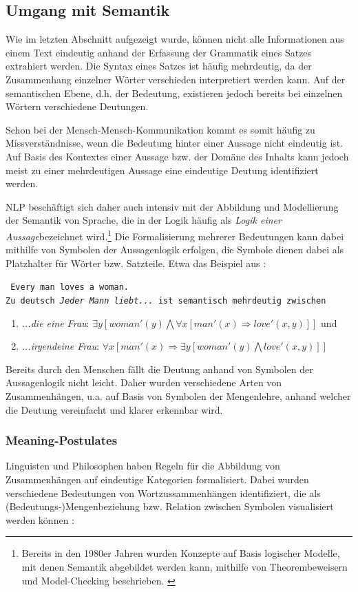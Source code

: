 \documentclass[12pt]{report}
\begin{document}
\subsection{Umgang mit Semantik}
Wie im letzten Abschnitt aufgezeigt wurde, können nicht alle Informationen aus einem Text eindeutig anhand der Erfassung der Grammatik eines Satzes extrahiert werden. Die Syntax eines Satzes ist häufig mehrdeutig, da der Zusammenhang einzelner Wörter verschieden interpretiert werden kann. Auf der semantischen Ebene, d.h. der Bedeutung, existieren jedoch bereits bei einzelnen Wörtern verschiedene Deutungen. 

Schon bei der Mensch-Mensch-Kommunikation kommt es somit häufig zu Missverständnisse, wenn die Bedeutung hinter einer Aussage nicht eindeutig ist. Auf Basis des Kontextes einer Aussage bzw. der Domäne des Inhalts kann jedoch meist zu einer mehrdeutigen Aussage eine eindeutige Deutung identifiziert werden.

NLP beschäftigt sich daher auch intensiv mit der Abbildung und Modellierung der Semantik von Sprache, die in der Logik häufig als \glqq \textit{Logik einer Aussage}\grqq bezeichnet wird.\footnote{Bereits in den 1980er Jahren wurden Konzepte auf Basis logischer Modelle, mit denen Semantik abgebildet werden kann, mithilfe von Theorembeweisern und Model-Checking beschrieben. \cite{sb88} \cite{kn85}} Die Formalisierung mehrerer Bedeutungen kann dabei mithilfe von Symbolen der Aussagenlogik erfolgen, die Symbole dienen dabei als Platzhalter für Wörter bzw. Satzteile. Etwa das Beispiel aus \cite{rs18}:

\tt
Every man loves a woman.
\rm
\\
Zu deutsch \textit{\glqq  Jeder Mann liebt...\grqq{}} ist semantisch mehrdeutig zwischen  
\begin{enumerate}
\item \textit{\glqq  ...die eine Frau\grqq{}}: $\exists y [woman'(y) \bigwedge \forall x [man'(x) \Rightarrow love'(x,y)]]$ und
\item \textit{\glqq  ...irgendeine Frau\grqq{}}: $\forall x [man'(x) \Rightarrow \exists y [woman'(y) \bigwedge love'(x,y)]]$
\end{enumerate}

Bereits durch den Menschen fällt die Deutung anhand von Symbolen der Aussagenlogik nicht leicht. Daher wurden verschiedene Arten von Zusammenhängen, u.a. auf Basis von Symbolen der Mengenlehre, anhand welcher die Deutung vereinfacht und klarer erkennbar wird. 

\subsubsection{Meaning-Postulates}
Linguisten und Philosophen haben Regeln für die Abbildung von Zusammenhängen auf eindeutige Kategorien formalisiert. Dabei wurden verschiedene Bedeutungen von Wortzussammenhängen identifiziert, die als (Bedeutungs-)Mengenbeziehung bzw. Relation zwischen Symbolen visualisiert werden können \cite{car52}:
\end{document}

